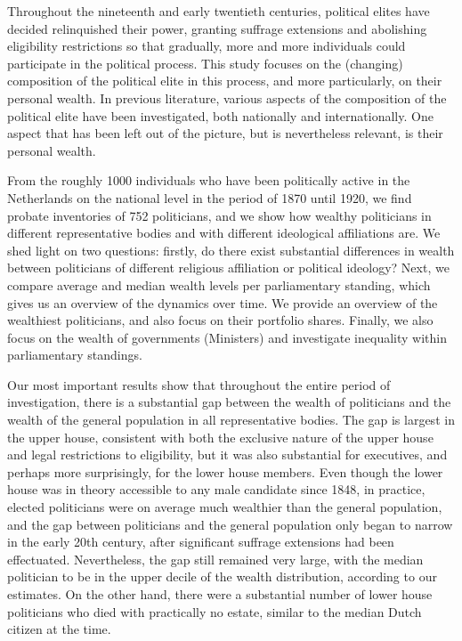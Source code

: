     Throughout the nineteenth and early twentieth centuries, political elites have decided relinquished their power, granting suffrage extensions and abolishing eligibility restrictions so that gradually, more and more individuals could participate in the political process. This study focuses on the (changing) composition of the political elite in this process, and more particularly, on their personal wealth. In previous literature, various aspects of the composition of the political elite have been investigated, both nationally and internationally. One aspect that has been left out of the picture, but is nevertheless relevant, is their personal wealth. %
    
    From the roughly 1000 individuals who have been politically active in the Netherlands on the national level in the period of 1870 until 1920, we find probate inventories of 752 politicians, and we show how wealthy politicians in different representative bodies and with different ideological affiliations are. We shed light on two questions: firstly, do there exist substantial differences in wealth between politicians of different religious affiliation or political ideology? Next, we compare average and median wealth levels per parliamentary standing, which gives us an overview of the dynamics over time. We provide an overview of the wealthiest politicians, and also focus on their portfolio shares. Finally, we also focus on the wealth of governments (Ministers) and investigate inequality within parliamentary standings. 

    Our most important results show that throughout the entire period of investigation, there is a substantial gap between the wealth of politicians and the wealth of the general population in all representative bodies. The gap is largest in the upper house, consistent with both the exclusive nature of the upper house and legal restrictions to eligibility, but it was also substantial for executives, and perhaps more surprisingly, for the lower house members. Even though the lower house was in theory accessible to any male candidate since 1848, in practice, elected politicians were on average much wealthier than the general population, and the gap between politicians and the general population only began to narrow in the early 20th century, after significant suffrage extensions had been effectuated. Nevertheless, the gap still remained very large, with the median politician to be in the upper decile of the wealth distribution, according to our estimates. On the other hand, there were a substantial number of lower house politicians who died with practically no estate, similar to the median Dutch citizen at the time.\autocite{de2020exploring}
    
